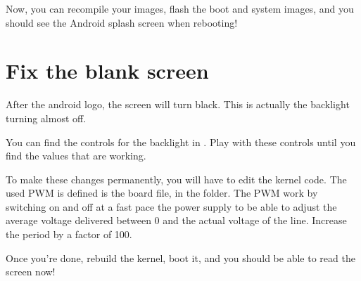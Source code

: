 Now, you can recompile your images, flash the boot and system images,
and you should see the Android splash screen when rebooting!

\section{Fix the blank screen}

After the android logo, the screen will turn black. This is actually
the backlight turning almost off.

You can find the controls for the backlight in
. Play with these controls until you find
the values that are working.

To make these changes permanently, you will have to edit the kernel
code. The used PWM is defined is the  board file, in
the  folder. The PWM work by switching on
and off at a fast pace the power supply to be able to adjust the
average voltage delivered between 0 and the actual voltage of the
line. Increase the period by a factor of 100.

Once you're done, rebuild the kernel, boot it, and you should be able
to read the screen now!

